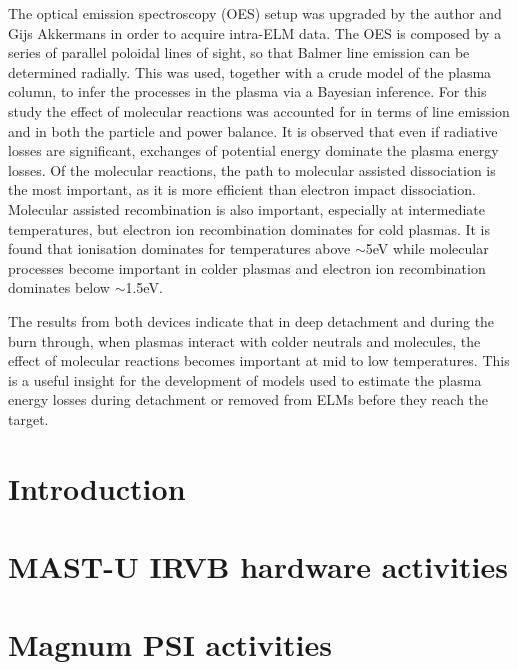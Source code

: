 \documentclass[]{yorkThesis}  %
\begin{document}
The optical emission spectroscopy (OES) setup was upgraded by the author and Gijs Akkermans in order to acquire intra-ELM data. The OES is composed by a series of parallel poloidal lines of sight, so that Balmer line emission can be determined radially. This was used, together with a crude model of the plasma column, to infer the processes in the plasma via a Bayesian inference. For this study the effect of molecular reactions was accounted for in terms of line emission and in both the particle and power balance. It is observed that even if radiative losses are significant, exchanges of potential energy dominate the plasma energy losses. Of the molecular reactions, the path to molecular assisted dissociation is the most important, as it is more efficient than electron impact dissociation. Molecular assisted recombination is also important, especially at intermediate temperatures, but electron ion recombination dominates for cold plasmas. It is found that ionisation dominates for temperatures above $\sim$5eV while molecular processes become important in colder plasmas and electron ion recombination dominates below $\sim$1.5eV.

The results from both devices indicate that in deep detachment and during the burn through, when plasmas interact with colder neutrals and molecules, the effect of molecular reactions becomes important at mid to low temperatures. This is a useful insight for the development of models used to estimate the plasma energy losses during detachment or removed from ELMs before they reach the target.


\pagestyle{headings}
\chapter{Introduction}\label{chapter1}





\chapter{MAST-U IRVB hardware activities}\label{chapter2}


\chapter{Magnum PSI activities}\label{chapter3}




\end{document}
